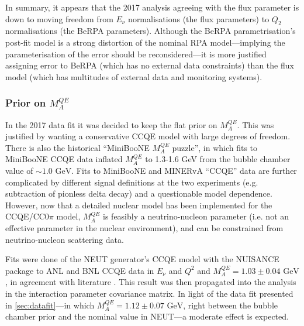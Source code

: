 In summary, it appears that the 2017 analysis agreeing with the flux parameter is down to moving freedom from $E_\nu$ normalisations (the flux parameters) to $Q_2$ normalisations (the BeRPA parameters). Although the BeRPA parametrisation's post-fit model is a strong distortion of the nominal RPA model---implying the parameterisation of the error should be reconsidered---it is more justified assigning error to BeRPA (which has no external data constraints) than the flux model (which has multitudes of external data and monitoring systems).

\subsubsection{Prior on $M_{A}^{QE}$}
In the 2017 data fit it was decided to keep the flat prior on $M_A^{QE}$. This was justified by wanting a conservative CCQE model with large degrees of freedom. There is also the historical ``MiniBooNE $M_A^{QE}$ puzzle'', in which fits to MiniBooNE CCQE data inflated $M_A^{QE}$ to 1.3-1.6 GeV from the bubble chamber value of $\sim1.0\text{ GeV}$. Fits to MiniBooNE and MINERvA ``CCQE'' data are further complicated by different signal definitions at the two experiments (e.g. subtraction of pionless delta decay) and a questionable model dependence.  However, now that a detailed nuclear model has been implemented for the CCQE/CC0$\pi$ model, $M_A^{QE}$ is feasibly a neutrino-nucleon parameter (i.e. not an effective parameter in the nuclear environment), and can be constrained from neutrino-nucleon scattering data.

Fits were done of the NEUT generator's CCQE model with the NUISANCE package to ANL and BNL CCQE data in $E_\nu$ and $Q^2$  and $M_A^{QE}=1.03\pm0.04\text{ GeV}$, in agreement with literature . This result was then propagated into the analysis in the interaction parameter covariance matrix. In light of the data fit presented in \autoref{sec:datafit}---in which $M_A^{QE}=1.12\pm0.07\text{ GeV}$, right between the bubble chamber prior and the nominal value in NEUT---a moderate effect is expected.

